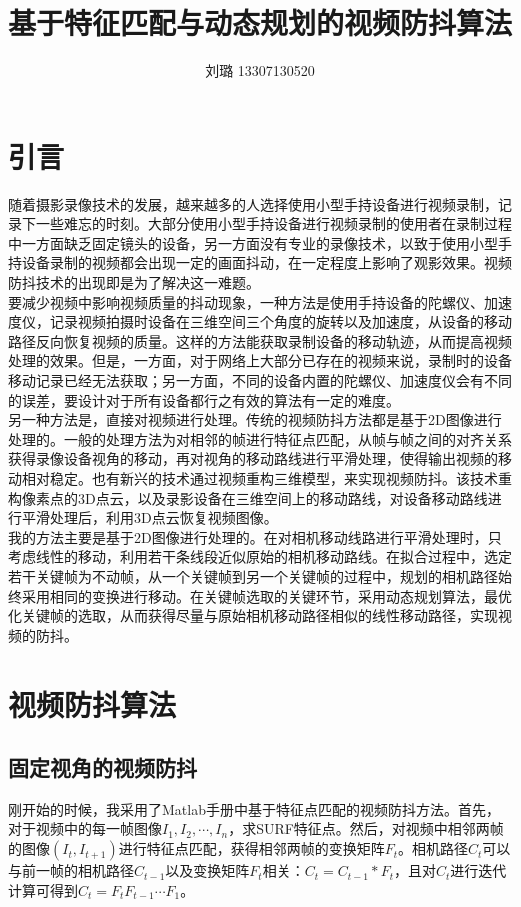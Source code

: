 \documentclass[journal, a4paper]{IEEEtran}
\begin{document}
    \title{基于特征匹配与动态规划的视频防抖算法}
    \author{刘璐 13307130520}
    \maketitle

\section{引言}
    随着摄影录像技术的发展，越来越多的人选择使用小型手持设备进行视频录制，记录下一些难忘的时刻。大部分使用小型手持设备进行视频录制的使用者在录制过程中一方面缺乏固定镜头的设备，另一方面没有专业的录像技术，以致于使用小型手持设备录制的视频都会出现一定的画面抖动，在一定程度上影响了观影效果。视频防抖技术的出现即是为了解决这一难题。 \\
    
    要减少视频中影响视频质量的抖动现象，一种方法是使用手持设备的陀螺仪、加速度仪，记录视频拍摄时设备在三维空间三个角度的旋转以及加速度，从设备的移动路径反向恢复视频的质量。这样的方法能获取录制设备的移动轨迹，从而提高视频处理的效果\cite{GYR1}\cite{GYR2}。但是，一方面，对于网络上大部分已存在的视频来说，录制时的设备移动记录已经无法获取；另一方面，不同的设备内置的陀螺仪、加速度仪会有不同的误差，要设计对于所有设备都行之有效的算法有一定的难度。\\
    
    另一种方法是，直接对视频进行处理。传统的视频防抖方法都是基于2D图像进行处理的。一般的处理方法为对相邻的帧进行特征点匹配，从帧与帧之间的对齐关系获得录像设备视角的移动，再对视角的移动路线进行平滑处理，使得输出视频的移动相对稳定\cite{L1Opt}。也有新兴的技术通过视频重构三维模型，来实现视频防抖。该技术重构像素点的3D点云，以及录影设备在三维空间上的移动路线，对设备移动路线进行平滑处理后，利用3D点云恢复视频图像\cite{FLiu1}\cite{FLiu2}。 \\
    
    我的方法主要是基于2D图像进行处理的。在对相机移动线路进行平滑处理时，只考虑线性的移动，利用若干条线段近似原始的相机移动路线。在拟合过程中，选定若干关键帧为不动帧，从一个关键帧到另一个关键帧的过程中，规划的相机路径始终采用相同的变换进行移动。在关键帧选取的关键环节，采用动态规划算法，最优化关键帧的选取，从而获得尽量与原始相机移动路径相似的线性移动路径，实现视频的防抖。

\section{视频防抖算法}
\subsection{固定视角的视频防抖}
    刚开始的时候，我采用了Matlab手册中基于特征点匹配的视频防抖方法\cite{Matlab}。首先，对于视频中的每一帧图像$I_{1}, I_{2}, \cdots, I_{n}$，求SURF特征点。然后，对视频中相邻两帧的图像$(I_{t}, I_{t+1})$进行特征点匹配，获得相邻两帧的变换矩阵$F_{t}$。相机路径$C_{t}$可以与前一帧的相机路径$C_{t-1}$以及变换矩阵$F_{t}$相关：$C_{t}=C_{t-1}*F_{t}$，且对$C_{t}$进行迭代计算可得到$C_{t}=F_{t}F_{t-1}\cdots F_{1}$。 \\
    
\end{document}
